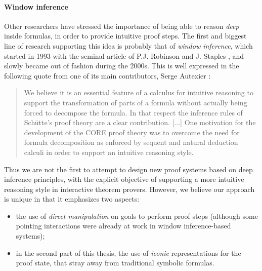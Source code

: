 \paragraph{Window inference}

Other researchers have stressed the importance of being able to reason
\emph{deep} inside formulas, in order to provide intuitive proof steps. The
first and biggest line of research supporting this idea is probably that of
\emph{window inference}, which started in 1993 with the seminal article of P.J.
Robinson and J. Staples , and slowly became
out of fashion during the 2000s. This is well expressed in the following quote
from one of its main contributors, Serge Autexier
:

\begin{quote}
We believe it is an essential feature of a calculus for intuitive reasoning to
support the transformation of parts of a formula without actually being forced
to decompose the formula. In that respect the inference rules of Schütte's proof
theory are a clear contribution. [...] One motivation for the development of the
CORE proof theory was to overcome the need for formula decomposition as enforced
by sequent and natural deduction calculi in order to support an intuitive
reasoning style.
\end{quote}

Thus we are not the first to attempt to design new proof systems based on deep
inference principles, with the explicit objective of supporting a more intuitive
reasoning style in interactive theorem provers. However, we believe our approach is unique in that it emphasizes two
aspects:
\begin{itemize}
  \item the use of \emph{direct manipulation} on goals to perform proof steps
  (although some pointing interactions were already at work in window
  inference-based systems);
  \item in the second part of this thesis, the use of \emph{iconic}
  representations for the proof state, that stray away from traditional symbolic
  formulas.
\end{itemize}

